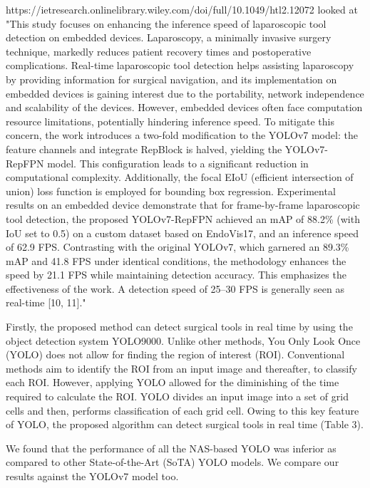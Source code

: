 https://ietresearch.onlinelibrary.wiley.com/doi/full/10.1049/htl2.12072 looked at "This study focuses on enhancing the inference speed of laparoscopic tool detection on embedded devices. Laparoscopy, a minimally invasive surgery technique, markedly reduces patient recovery times and postoperative complications. Real-time laparoscopic tool detection helps assisting laparoscopy by providing information for surgical navigation, and its implementation on embedded devices is gaining interest due to the portability, network independence and scalability of the devices. However, embedded devices often face computation resource limitations, potentially hindering inference speed. To mitigate this concern, the work introduces a two-fold modification to the YOLOv7 model: the feature channels and integrate RepBlock is halved, yielding the YOLOv7-RepFPN model. This configuration leads to a significant reduction in computational complexity. Additionally, the focal EIoU (efficient intersection of union) loss function is employed for bounding box regression. Experimental results on an embedded device demonstrate that for frame-by-frame laparoscopic tool detection, the proposed YOLOv7-RepFPN achieved an mAP of 88.2\% (with IoU set to 0.5) on a custom dataset based on EndoVis17, and an inference speed of 62.9 FPS. Contrasting with the original YOLOv7, which garnered an 89.3\% mAP and 41.8 FPS under identical conditions, the methodology enhances the speed by 21.1 FPS while maintaining detection accuracy. This emphasizes the effectiveness of the work. A detection speed of 25–30 FPS is generally seen as real-time [10, 11]."

Firstly, the proposed method can detect surgical tools in real time by using the object detection system YOLO9000. Unlike other methods, You Only Look Once (YOLO) does not allow for finding the region of interest (ROI). Conventional methods aim to identify the ROI from an input image and thereafter, to classify each ROI. However, applying YOLO allowed for the diminishing of the time required to calculate the ROI. YOLO divides an input image into a set of grid cells and then, performs classification of each grid cell. Owing to this key feature of YOLO, the proposed algorithm can detect surgical tools in real time (Table 3).

We found that the performance of all the NAS-based YOLO was inferior as compared to other State-of-the-Art (SoTA) YOLO models. We compare our results against the YOLOv7 model too.

